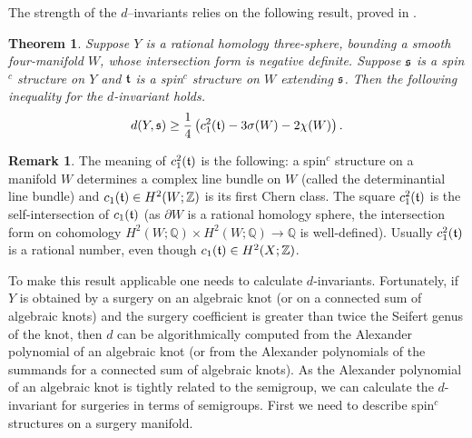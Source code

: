 \documentclass[11pt]{amsart}
\numberwithin{equation}{section}
\theoremstyle{plain}
\newtheorem{theorem}[equation]{Theorem}
\theoremstyle{definition}
\newtheorem{remark}[equation]{Remark}
\begin{document}
The strength of the $d$--invariants relies on the following result, proved in \cite[Theorem 9.1]{OS-absolute}.
\begin{theorem}\label{thm:osabs}
Suppose $Y$ is a rational homology three-sphere, 
bounding a smooth four-manifold $W$, whose intersection form is negative definite. Suppose ${\ifmmode{{\mathfrak s}}\else{${\mathfrak s}$\ }\fi}$ is
a {spin$^c$}{} structure on $Y$ and ${\ifmmode{{\mathfrak t}}\else{${\mathfrak t}$\ }\fi}$ is a {spin$^c$}{} structure on $W$ extending ${\ifmmode{{\mathfrak s}}\else{${\mathfrak s}$\ }\fi}$.
Then the following inequality for the $d$-invariant holds.
\begin{equation}\label{eq:dinvinequality}
d(Y,{\ifmmode{{\mathfrak s}}\else{${\mathfrak s}$\ }\fi})\ge \frac14\left(c_1^2({\ifmmode{{\mathfrak t}}\else{${\mathfrak t}$\ }\fi})-3\sigma(W)-2\chi(W)\right).
\end{equation}
\end{theorem}
\begin{remark}\label{rem:notation}
The meaning of $c_1^2({\ifmmode{{\mathfrak t}}\else{${\mathfrak t}$\ }\fi})$ is the following: a {spin$^c$}{} structure on a manifold $W$ determines a complex line bundle on $W$
(called the determinantial line bundle) and $c_1({\ifmmode{{\mathfrak t}}\else{${\mathfrak t}$\ }\fi})\in H^2(W;{\mathbb Z})$ is its first Chern class. The square $c_1^2({\ifmmode{{\mathfrak t}}\else{${\mathfrak t}$\ }\fi})$ is the self-intersection
of $c_1({\ifmmode{{\mathfrak t}}\else{${\mathfrak t}$\ }\fi})$ (as $\partial W$ is a rational homology sphere, 
the intersection form on cohomology $H^2(W;{\mathbb Q})\times H^2(W;{\mathbb Q})\to{\mathbb Q}$ is well-defined). Usually $c_1^2({\ifmmode{{\mathfrak t}}\else{${\mathfrak t}$\ }\fi})$ is a rational number,
even though $c_1({\ifmmode{{\mathfrak t}}\else{${\mathfrak t}$\ }\fi})\in H^2(X;{\mathbb Z})$.
\end{remark}

To make this result applicable one needs to calculate $d$-invariants. Fortunately, if $Y$ is obtained by a surgery on an algebraic knot 
(or on a connected sum of algebraic knots) and the surgery coefficient is greater than twice the Seifert genus of the knot, then $d$ can be algorithmically
computed from the Alexander polynomial of an algebraic knot (or from the Alexander polynomials of the summands for a connected sum of algebraic
knots). As the Alexander polynomial of an algebraic knot is tightly related to the semigroup, we can calculate the $d$-invariant
for surgeries in terms of semigroups. First we need to describe {spin$^c$}{} structures on a surgery manifold.
\end{document}
